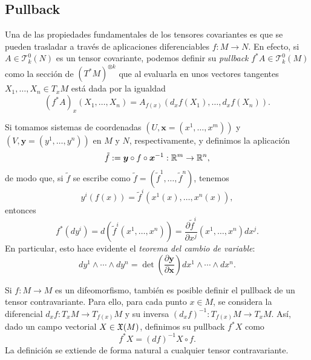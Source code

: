 \documentclass[11pt,a4paper]{amsbook}
\theoremstyle{remark} \newtheorem{rmk}[subsection]{Observación}
\theoremstyle{definition} \newtheorem{defn}[subsection]{Definición}
\theoremstyle{definition} \newtheorem{ex}[subsection]{Ejemplo}
\theoremstyle{definition} \newtheorem{ej}[subsection]{Ejercicio}
\begin{document}
\subsection{Pullback} Una de las propiedades fundamentales de los tensores covariantes es que se pueden trasladar a través de aplicaciones diferenciables $f:M\rightarrow N$. En efecto, si $A \in \mathcal{T}^0_k(N)$ es un tensor covariante, podemos definir su \emph{pullback} $f^*A \in \mathcal{T}^0_k(M)$ como la sección de $(T^*M)^{\otimes k}$ que al evaluarla en unos vectores tangentes $X_1,\dots,X_n \in T_xM$ está dada por la igualdad
\begin{equation*}
(f^*A)_x (X_1,\dots,X_n) = A_{f(x)}(d_xf(X_1),\dots,d_xf(X_n)).
\end{equation*}

Si tomamos sistemas de coordenadas $(U,\bm{x}=(x^1,\dots,x^m))$ y $(V,\bm{y}=(y^1,\dots,y^n))$ en $M$ y $N$, respectivamente, y definimos la aplicación
\begin{equation*}
\tilde{f}:= \bm{y} \circ f \circ \bm{x}^{-1}: \mathbb R^m \rightarrow \mathbb R^n,
\end{equation*}
de modo que, si $\tilde{f}$ se escribe como $\tilde{f}=(\tilde{f}^1,\dots,\tilde{f}^n)$, tenemos
\begin{equation*}
y^i(f(x)) = \tilde{f}^i(x^1(x),\dots,x^n(x)),
\end{equation*}
entonces
\begin{equation*}
f^*(dy^i) = d(\tilde{f}^i(x^1,\dots,x^n)) = \frac{\partial \tilde{f}^i}{\partial x^j}(x^1,\dots,x^n) dx^j.
\end{equation*}
En particular, esto hace evidente el \emph{teorema del cambio de variable}:
\begin{equation*}
dy^1 \wedge \cdots \wedge dy^n = \det \left(\frac{\partial \bm{y}}{\partial \bm{x}} \right) dx^1 \wedge \cdots \wedge dx^n.
\end{equation*}

Si $f:M\rightarrow M$ es un difeomorfismo, también es posible definir el pullback de un tensor contravariante. Para ello, para cada punto $x\in M$, se considera la diferencial $d_xf: T_xM \rightarrow T_{f(x)}M$ y su inversa $(d_xf)^{-1}: T_{f(x)}M \rightarrow T_xM$. Así, dado un campo vectorial $X\in \mathfrak X(M)$, definimos su pullback $f^* X$ como
\begin{equation*}
f^* X = (df)^{-1} X \circ f.
\end{equation*}
La definición se extiende de forma natural a cualquier tensor contravariante.
\end{document}
